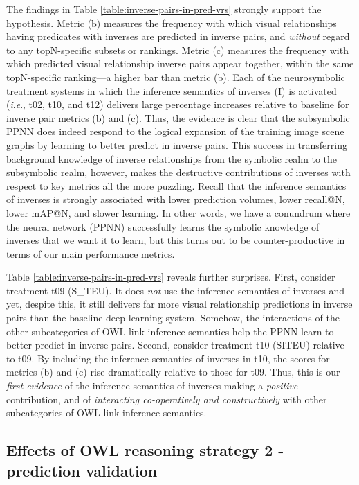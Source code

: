 \documentclass[]{jair}
\newcommand{\ie}{\textit{i}.\textit{e}.,\xspace}
\begin{document}
The findings in Table \ref{table:inverse-pairs-in-pred-vrs} strongly support the hypothesis.
Metric (b) measures the frequency with which visual relationships having predicates with inverses are predicted in inverse pairs, and \emph{without} regard to any topN-specific subsets or rankings.
Metric (c) measures the frequency with which predicted visual relationship inverse pairs appear together, within the same topN-specific ranking---a higher bar than metric (b).
Each of the neurosymbolic treatment systems in which the inference semantics of inverses (I) is activated (\ie t02, t10, and t12) delivers large percentage increases relative to baseline for inverse pair metrics (b) and (c). 
Thus, the evidence is clear that the subsymbolic PPNN does indeed respond to the logical expansion of the training image scene graphs by learning to better predict in inverse pairs.
This success in transferring background knowledge of inverse relationships from the symbolic realm to the subsymbolic realm, however, makes the destructive contributions of inverses with respect to key metrics all the more puzzling.
Recall that the inference semantics of inverses is strongly associated with lower prediction volumes, lower recall@N, lower mAP@N, and slower learning.
In other words, we have a conundrum where the neural network (PPNN) successfully learns the symbolic knowledge of inverses that we want it to learn, but this turns out to be counter-productive in terms of our main performance metrics.

Table \ref{table:inverse-pairs-in-pred-vrs} reveals further surprises.
First, consider treatment t09 (S\_TEU).
It does \emph{not} use the inference semantics of inverses and yet, despite this, it still delivers far more visual relationship predictions in inverse pairs than the baseline deep learning system.
Somehow, the interactions of the other subcategories of OWL link inference semantics help the PPNN learn to better predict in inverse pairs.
Second, consider treatment t10 (SITEU) relative to t09.
By including the inference semantics of inverses in t10, the scores for metrics (b) and (c) rise dramatically relative to those for t09.
Thus, this is our \emph{first evidence} of the inference semantics of inverses making a \emph{positive} contribution, and of \emph{interacting co-operatively and constructively} with other subcategories of OWL link inference semantics.




\subsection{Effects of OWL reasoning strategy 2 - prediction validation}
\end{document}
